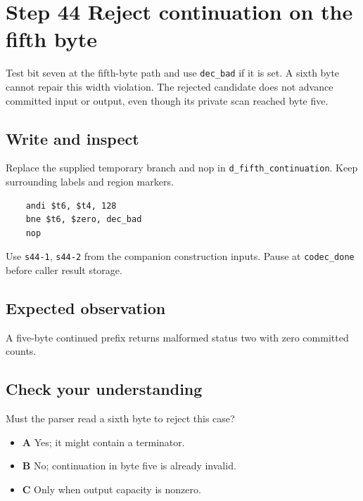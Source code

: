 \section{Step 44 Reject continuation on the fifth byte}\label{delta-s44}

Test bit seven at the fifth-byte path and use \texttt{dec\_bad} if it is set. A sixth byte cannot repair this width violation. The rejected candidate does not advance committed input or output, even though its private scan reached byte five.

\subsection{Write and inspect}
Replace the supplied temporary branch and nop in \texttt{d\_fifth\_continuation}. Keep surrounding labels and region markers.

\begin{verbatim}
    andi $t6, $t4, 128
    bne $t6, $zero, dec_bad
    nop
\end{verbatim}
Use \texttt{s44-1}, \texttt{s44-2} from the companion construction inputs. Pause at \texttt{codec\_done} before caller result storage.

\subsection{Expected observation}
A five-byte continued prefix returns malformed status two with zero committed counts.

\subsection{Check your understanding}
Must the parser read a sixth byte to reject this case?

\begin{itemize}
  \item \textbf{A} Yes; it might contain a terminator.
  \item \textbf{B} No; continuation in byte five is already invalid.
  \item \textbf{C} Only when output capacity is nonzero.
\end{itemize}
